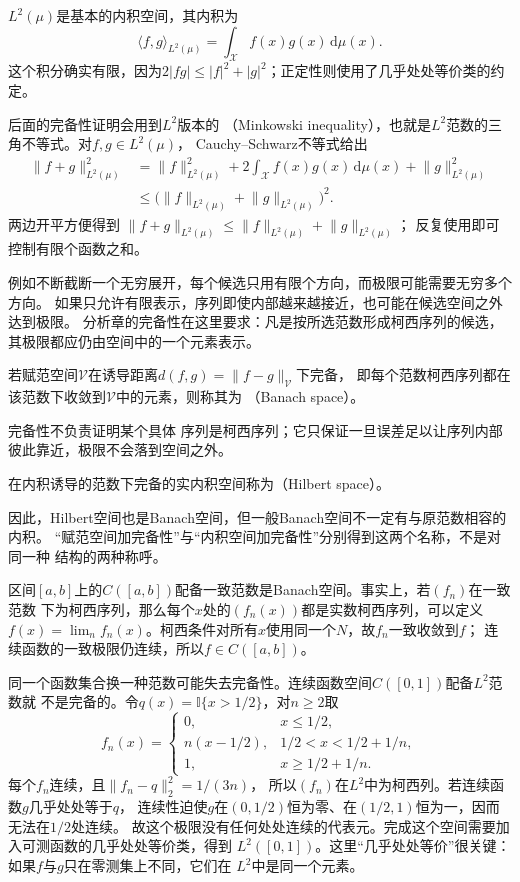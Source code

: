 $L^2(\mu)$是基本的内积空间，其内积为
\[
  \langle f,g\rangle_{L^2(\mu)}
  =\int_{\mathcal{X}}f(x)g(x)\,\mathrm{d}\mu(x).
\]
这个积分确实有限，因为$2|fg|\leq |f|^2+|g|^2$；正定性则使用了几乎处处等价类的约定。

后面的完备性证明会用到$L^2$版本的
（Minkowski inequality），也就是$L^2$范数的三角不等式。对$f,g\in L^2(\mu)$，
Cauchy--Schwarz不等式给出
\[
  \begin{aligned}
  \lVert f+g\rVert_{L^2(\mu)}^2
  &=
  \lVert f\rVert_{L^2(\mu)}^2
  +
  2\int_{\mathcal{X}}f(x)g(x)\,\mathrm{d}\mu(x)
  +\lVert g\rVert_{L^2(\mu)}^2\\
  &\leq
  \bigl(
    \lVert f\rVert_{L^2(\mu)}
    +
    \lVert g\rVert_{L^2(\mu)}
  \bigr)^2.
  \end{aligned}
\]
两边开平方便得到
$\lVert f+g\rVert_{L^2(\mu)}
\leq\lVert f\rVert_{L^2(\mu)}+\lVert g\rVert_{L^2(\mu)}$；
反复使用即可控制有限个函数之和。

例如不断截断一个无穷展开，每个候选只用有限个方向，而极限可能需要无穷多个方向。
如果只允许有限表示，序列即使内部越来越接近，也可能在候选空间之外达到极限。
分析章的完备性在这里要求：凡是按所选范数形成柯西序列的候选，
其极限都应仍由空间中的一个元素表示。
\begin{definition}[Banach空间]
\label{def:functional-banach-space}
若赋范空间$\mathcal V$在诱导距离$d(f,g)=\lVert f-g\rVert_{\mathcal V}$下完备，
即每个范数柯西序列都在该范数下收敛到$\mathcal V$中的元素，则称其为
（Banach space）。
\end{definition}
完备性不负责证明某个具体
序列是柯西序列；它只保证一旦误差足以让序列内部彼此靠近，极限不会落到空间之外。

\begin{definition}[Hilbert空间]
\label{def:functional-hilbert-space}
在内积诱导的范数下完备的实内积空间称为（Hilbert space）。
\end{definition}
因此，Hilbert空间也是Banach空间，但一般Banach空间不一定有与原范数相容的内积。
“赋范空间加完备性”与“内积空间加完备性”分别得到这两个名称，不是对同一种
结构的两种称呼。

区间$[a,b]$上的$C([a,b])$配备一致范数是Banach空间。事实上，若$(f_n)$在一致范数
下为柯西序列，那么每个$x$处的$(f_n(x))$都是实数柯西序列，可以定义
$f(x)=\lim_n f_n(x)$。柯西条件对所有$x$使用同一个$N$，故$f_n$一致收敛到$f$；
连续函数的一致极限仍连续，所以$f\in C([a,b])$。

同一个函数集合换一种范数可能失去完备性。连续函数空间$C([0,1])$配备$L^2$范数就
不是完备的。令$q(x)=\mathbb{I}\{x>1/2\}$，对$n\geq2$取
\[
 f_n(x)=
 \begin{cases}
  0,&x\leq1/2,\\
  n(x-1/2),&1/2<x<1/2+1/n,\\
  1,&x\geq1/2+1/n.
 \end{cases}
\]
每个$f_n$连续，且$\lVert f_n-q\rVert_2^2=1/(3n)$，
所以$(f_n)$在$L^2$中为柯西列。若连续函数$g$几乎处处等于$q$，
连续性迫使$g$在$(0,1/2)$恒为零、在$(1/2,1)$恒为一，因而无法在$1/2$处连续。
故这个极限没有任何处处连续的代表元。完成这个空间需要加入可测函数的几乎处处等价类，得到
$L^2([0,1])$。这里“几乎处处等价”很关键：如果$f$与$g$只在零测集上不同，它们在
$L^2$中是同一个元素。

